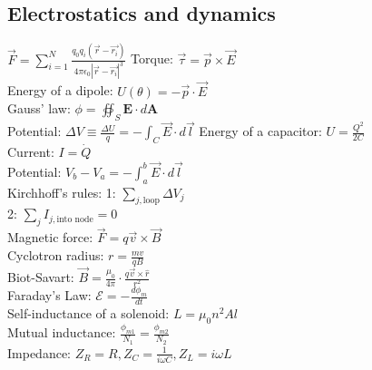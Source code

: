 \documentclass[12pt,a4paper]{article}
\begin{document}
	\subsection*{Electrostatics and dynamics}
	$\vec{F} = \sum_{i=1}^{N} \frac{q_0 q_i (\vec{r}-\vec{r_i})}{4\pi \epsilon_0 |\vec{r}-\vec{r_i}|^3}$
	Torque: $\vec{\tau} = \vec{p} \times \vec{E}$\\
	Energy of a dipole: $U(\theta) = -\vec{p} \cdot \vec{E}$\\
	Gauss' law: $ \phi = \oiint_{S} \textbf{E} \cdot d\textbf{A} $ \\
	Potential: $\Delta V \equiv \frac{\Delta U}{q} = - \int_{C} \vec{E} \cdot d\vec{l}$
	Energy of a capacitor: $U = \frac{Q^2}{2C}$\\
	Current: $I = \dot{Q}$\\
	Potential: $V_b - V_a = -\int_{a}^{b} \vec{E} \cdot d\vec{l}$\\
	Kirchhoff's rules: 1: $\sum_{j, \text{loop}} \Delta V_j$\\
	2: $\sum_{j} I_{j, \text{into node}} = 0$\\
	Magnetic force: $\vec{F} = q\vec{v} \times \vec{B}$\\
	Cyclotron radius: $r = \frac{mv}{qB}$\\
	Biot-Savart: $\vec{B} = \frac{\mu_0}{4 \pi} \cdot \frac{q \vec{v} \times \hat{r}}{r^2}$\\
	Faraday's Law: $\mathcal{E} = -\frac{d \phi_m}{dt}$\\
	Self-inductance of a solenoid: $L = \mu_0 n^2 A l$\\
	Mutual inductance: $\frac{\phi_{m1}}{N_1} = \frac{\phi_{m2}}{N_2}$\\
	Impedance: $Z_R = R, Z_C = \frac{1}{i \omega C}, Z_L = i \omega L$\\
	
\end{document}
